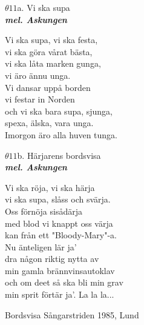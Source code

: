 \documentclass[a6paper,10pt]{article}
\newcommand{\mel}[1]{\small\textbf{\textit{mel. #1 \\}}}
\begin{document}
\setlength{\oddsidemargin}{-0.37in}
\begin{center}
\Large $\theta11$a. Vi ska supa \\
\mel{Askungen}
\end{center}
Vi ska supa, vi ska festa,\\
vi ska göra vårat bästa,\\
vi ska låta marken gunga,\\
vi äro ännu unga.\\
Vi dansar uppå borden\\
vi festar in Norden\\
och vi ska bara supa, sjunga, \\
spexa, älska, vara unga.\\
Imorgon äro alla huven tunga.
\begin{center}
\vspace{20pt}
\Large $\theta11$b. Härjarens bordsvisa \\
\mel{Askungen}
\end{center}
Vi ska röja, vi ska härja\\
vi ska supa, slåss och svärja.\\
Oss förnöja sisådärja\\
med blod vi knappt oss värja\\
kan från ett "Bloody-Mary"-a.\\
Nu änteligen lär ja'\\
dra någon riktig nytta av\\
min gamla brännvinsautoklav\\
och om deet så ska bli min grav\\
min sprit förtär ja'.
\vspace{5pt}
La la la...
\begin{flushright}
Bordsvisa Sångarstriden 1985, Lund
\end{flushright}
\end{document}
